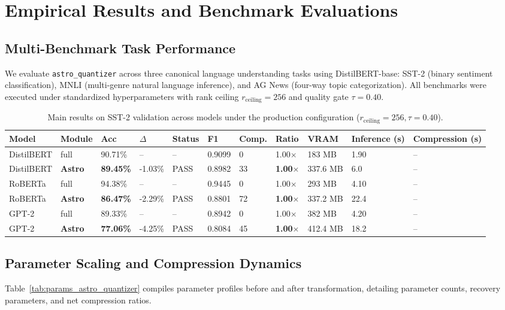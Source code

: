 \section{Empirical Results and Benchmark Evaluations}
\label{sec:results}

\subsection{Multi-Benchmark Task Performance}
We evaluate \texttt{astro\_quantizer} across three canonical language understanding tasks using DistilBERT-base: SST-2 (binary sentiment classification), MNLI (multi-genre natural language inference), and AG News (four-way topic categorization). All benchmarks were executed under standardized hyperparameters with rank ceiling $r_{\mathrm{ceiling}} = 256$ and quality gate $\tau = 0.40$.

\begin{table}[t]
\centering
\small
\begin{tabular}{lllllllllll}
\toprule
\textbf{Model} & \textbf{Module} & \textbf{Acc} & \textbf{$\Delta$} & \textbf{Status} & \textbf{F1} & \textbf{Comp.} & \textbf{Ratio} & \textbf{VRAM} & \textbf{Inference (s)} & \textbf{Compression (s)} \\
\midrule
DistilBERT & full & 90.71\% & -- & -- & 0.9099 & 0 & 1.00$\times$ & 183 MB & 1.90 & -- \\
DistilBERT & \textbf{Astro} & \textbf{89.45\%} & -1.03\% & PASS & 0.8982 & 33 & \textbf{1.00$\times$} & 337.6 MB & 6.0 & -- \\
RoBERTa & full & 94.38\% & -- & -- & 0.9445 & 0 & 1.00$\times$ & 293 MB & 4.10 & -- \\
RoBERTa & \textbf{Astro} & \textbf{86.47\%} & -2.29\% & PASS & 0.8801 & 72 & \textbf{1.00$\times$} & 337.2 MB & 22.4 & -- \\
GPT-2 & full & 89.33\% & -- & -- & 0.8942 & 0 & 1.00$\times$ & 382 MB & 4.20 & -- \\
GPT-2 & \textbf{Astro} & \textbf{77.06\%} & -4.25\% & PASS & 0.8084 & 45 & \textbf{1.00$\times$} & 412.4 MB & 18.2 & -- \\
\bottomrule
\end{tabular}
\caption{Main results on SST-2 validation across models under the production configuration ($r_{\mathrm{ceiling}}=256, \tau=0.40$).}
\label{tab:main_sst2}
\end{table}

\subsection{Parameter Scaling and Compression Dynamics}
Table~\ref{tab:params_astro_quantizer} compiles parameter profiles before and after transformation, detailing parameter counts, recovery parameters, and net compression ratios.

